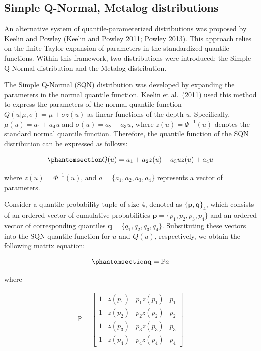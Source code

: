 \documentclass[
]{interact}
\begin{document}
\subsection{Simple Q-Normal, Metalog
distributions}\label{simple-q-normal-metalog-distributions}

An alternative system of quantile-parameterized distributions was
proposed by Keelin and Powley (Keelin and Powley 2011; Powley 2013).
This approach relies on the finite Taylor expansion of parameters in the
standardized quantile functions. Within this framework, two
distributions were introduced: the Simple Q-Normal distribution and the
Metalog distribution.

The Simple Q-Normal (SQN) distribution was developed by expanding the
parameters in the normal quantile function. Keelin et al.~(2011) used
this method to express the parameters of the normal quantile function
\(Q(u\vert\mu,\sigma)=\mu+\sigma z(u)\) as linear functions of the depth
\(u\). Specifically, \(\mu(u)=a_1+a_4u\) and \(\sigma(u)=a_2+a_3u\),
where \(z(u)=\Phi^{-1}(u)\) denotes the standard normal quantile
function. Therefore, the quantile function of the SQN distribution can
be expressed as follows:

\begin{equation}\phantomsection\label{eq-SQNQF}{
Q(u)= a_1+a_2z(u)+a_3uz(u)+a_4u\\
}\end{equation}

where \(z(u)=\Phi^{-1}(u)\), and \(a=\{a_1,a_2,a_3, a_4\}\) represents a
vector of parameters.

Consider a quantile-probability tuple of size 4, denoted as
\(\{\mathbf{p}, \mathbf{q}\}_4\), which consists of an ordered vector of
cumulative probabilities \(\mathbf{p}=\{p_1,p_2,p_3, p_4\}\) and an
ordered vector of corresponding quantiles
\(\mathbf{q}=\{q_1,q_2,q_3, q_4\}\). Substituting these vectors into the
SQN quantile function for \(u\) and \(Q(u)\), respectively, we obtain
the following matrix equation:

\begin{equation}\phantomsection\label{eq-sqn-matrix}{
\mathbf{q}=\mathbb Pa
}\end{equation}

where

\[
\begin{gathered}
\mathbb P=\begin{bmatrix} 1 & z(p_1) & p_1z(p_1) & p_1\\
                1 & z(p_2) & p_2z(p_2) & p_2\\
                1 & z(p_3) & p_3z(p_3) & p_3\\
                1 & z(p_4) & p_4z(p_4) & p_4\end{bmatrix}
\end{gathered}
\]
\end{document}
